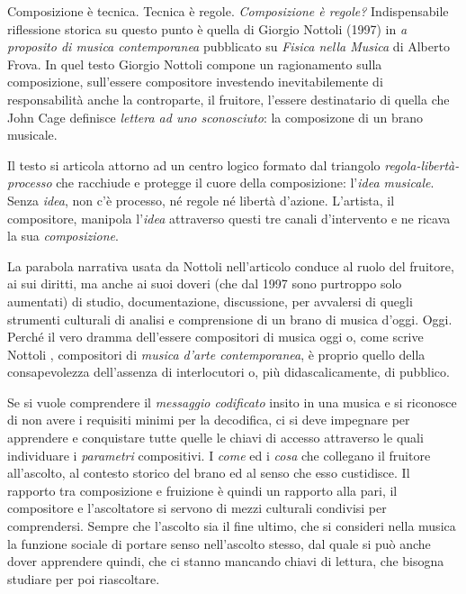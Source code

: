 Composizione è tecnica. Tecnica è regole. \emph{Composizione è regole?} Indispensabile
riflessione storica su questo punto è quella di Giorgio Nottoli  (1997) in
\emph{a proposito di musica contemporanea} pubblicato su \emph{Fisica nella Musica}
di Alberto Frova. In quel testo Giorgio Nottoli  compone un ragionamento sulla composizione,
sull'essere compositore investendo inevitabilemente di responsabilità anche la
controparte, il fruitore, l'essere destinatario di quella che John Cage  definisce
\emph{lettera ad uno sconosciuto}: la composizone di un brano musicale.

Il testo si articola attorno ad un centro logico formato dal triangolo
\emph{regola-libertà-processo} che racchiude e protegge il cuore della composizione:
l'\emph{idea musicale}. Senza \emph{idea}, non c'è processo, né regole né
libertà d'azione. L'artista, il compositore, manipola l'\emph{idea} attraverso
questi tre canali d'intervento e ne ricava la sua \emph{composizione}.

La parabola narrativa usata da Nottoli  nell'articolo conduce al ruolo del fruitore,
ai sui diritti, ma anche ai suoi doveri (che dal 1997 sono purtroppo solo aumentati)
di studio, documentazione, discussione, per avvalersi di quegli strumenti culturali di analisi e
comprensione di un brano di musica d'oggi. Oggi. Perché il vero dramma
dell'essere compositori di musica oggi o, come scrive Nottoli , compositori di
\emph{musica d'arte contemporanea}, è proprio quello della consapevolezza
dell'assenza di interlocutori o, più didascalicamente, di pubblico.

Se si vuole comprendere il \emph{messaggio codificato} insito in una musica e
si riconosce di non avere i requisiti minimi per la decodifica, ci si deve
impegnare per apprendere e conquistare tutte quelle le chiavi di accesso
attraverso le quali individuare i \emph{parametri} compositivi.
I \emph{come} ed i \emph{cosa} che collegano il fruitore all'ascolto, al
contesto storico del brano ed al senso che esso custidisce. Il
rapporto tra composizione e fruizione è quindi un rapporto alla pari, il
compositore e l'ascoltatore si servono di mezzi culturali condivisi per comprendersi.
Sempre che l'ascolto sia il fine ultimo, che si consideri nella musica la funzione
sociale di portare senso nell'ascolto stesso, dal quale si può anche dover
apprendere quindi, che ci stanno mancando chiavi di lettura, che bisogna studiare per
poi riascoltare.

